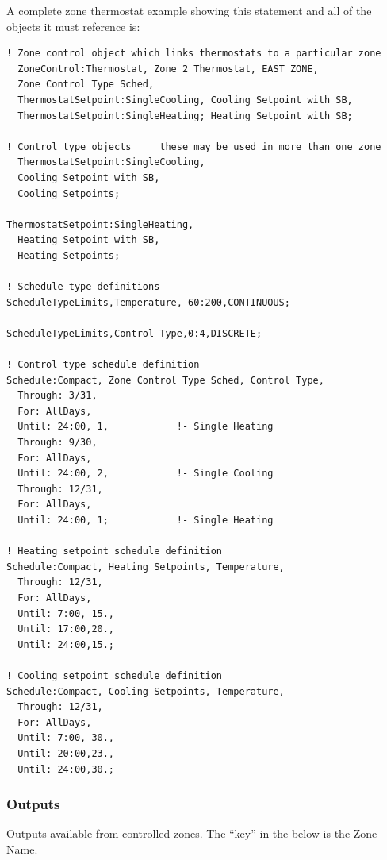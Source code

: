 A complete zone thermostat example showing this statement and all of the objects it must reference is:

\begin{lstlisting}
! Zone control object which links thermostats to a particular zone
  ZoneControl:Thermostat, Zone 2 Thermostat, EAST ZONE,
  Zone Control Type Sched,
  ThermostatSetpoint:SingleCooling, Cooling Setpoint with SB,
  ThermostatSetpoint:SingleHeating; Heating Setpoint with SB;

! Control type objects     these may be used in more than one zone
  ThermostatSetpoint:SingleCooling,
  Cooling Setpoint with SB,
  Cooling Setpoints;

ThermostatSetpoint:SingleHeating,
  Heating Setpoint with SB,
  Heating Setpoints;

! Schedule type definitions
ScheduleTypeLimits,Temperature,-60:200,CONTINUOUS;

ScheduleTypeLimits,Control Type,0:4,DISCRETE;

! Control type schedule definition
Schedule:Compact, Zone Control Type Sched, Control Type,
  Through: 3/31,
  For: AllDays,
  Until: 24:00, 1,            !- Single Heating
  Through: 9/30,
  For: AllDays,
  Until: 24:00, 2,            !- Single Cooling
  Through: 12/31,
  For: AllDays,
  Until: 24:00, 1;            !- Single Heating

! Heating setpoint schedule definition
Schedule:Compact, Heating Setpoints, Temperature,
  Through: 12/31,
  For: AllDays,
  Until: 7:00, 15.,
  Until: 17:00,20.,
  Until: 24:00,15.;

! Cooling setpoint schedule definition
Schedule:Compact, Cooling Setpoints, Temperature,
  Through: 12/31,
  For: AllDays,
  Until: 7:00, 30.,
  Until: 20:00,23.,
  Until: 24:00,30.;
\end{lstlisting}

\subsubsection{Outputs}\label{outputs-042}

Outputs available from controlled zones. The ``key'' in the below is the Zone Name.

